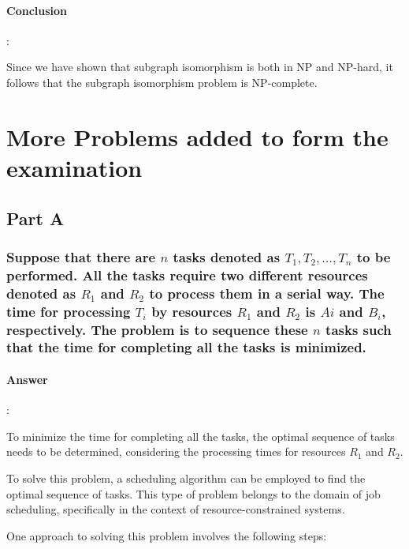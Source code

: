 \documentclass{article}
\begin{document}
\paragraph{Conclusion}:

Since we have shown that subgraph isomorphism is both in NP and NP-hard, it follows that the subgraph isomorphism problem is NP-complete.


\section{More Problems added to form the examination}

\subsection{Part A}

\subsubsection{Suppose that there are $n$ tasks denoted as $T_1, T_2, …, T_n$ to be performed. All the tasks require two different resources denoted as $R_1$ and $R_2$ to process them in a serial way. The time for processing $T_i$ by resources $R_1$ and $R_2$ is $Ai$ and $B_i$, respectively. The problem is to sequence these $n$ tasks such that the time for completing all the tasks is minimized.}

\paragraph{Answer}:

To minimize the time for completing all the tasks, the optimal sequence of tasks needs to be determined, considering the processing times for resources $R_1$ and $R_2$.

To solve this problem, a scheduling algorithm can be employed to find the optimal sequence of tasks. This type of problem belongs to the domain of job scheduling, specifically in the context of resource-constrained systems.

One approach to solving this problem involves the following steps:
\end{document}
